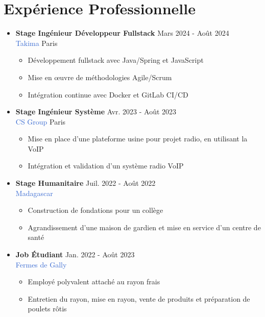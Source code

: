 \documentclass[11pt, a4paper]{article}
\begin{document}
\section*{Expérience Professionnelle}
\begin{itemize}
    \item \textbf{Stage Ingénieur Développeur Fullstack} \hfill Mars 2024 - Août 2024\\
          \textcolor{highlight}{Takima} \hfill Paris
          \begin{itemize}
              \item Développement fullstack avec Java/Spring et JavaScript
              \item Mise en œuvre de méthodologies Agile/Scrum
              \item Intégration continue avec Docker et GitLab CI/CD
          \end{itemize}

    \item \textbf{Stage Ingénieur Système} \hfill Avr. 2023 - Août 2023\\
          \textcolor{highlight}{CS Group} \hfill Paris
          \begin{itemize}
              \item Mise en place d'une plateforme usine pour projet radio, en utilisant la VoIP
              \item Intégration et validation d'un système radio VoIP
          \end{itemize}

    \item \textbf{Stage Humanitaire} \hfill Juil. 2022 - Août 2022\\
          \textcolor{highlight}{Madagascar}
          \begin{itemize}
              \item Construction de fondations pour un collège
              \item Agrandissement d'une maison de gardien et mise en service d'un centre de santé
          \end{itemize}

    \item \textbf{Job Étudiant} \hfill Jan. 2022 - Août 2023\\
          \textcolor{highlight}{Fermes de Gally}
          \begin{itemize}
              \item Employé polyvalent attaché au rayon frais
              \item Entretien du rayon, mise en rayon, vente de produits et préparation de poulets rôtis
          \end{itemize}
\end{itemize}
\end{document}

